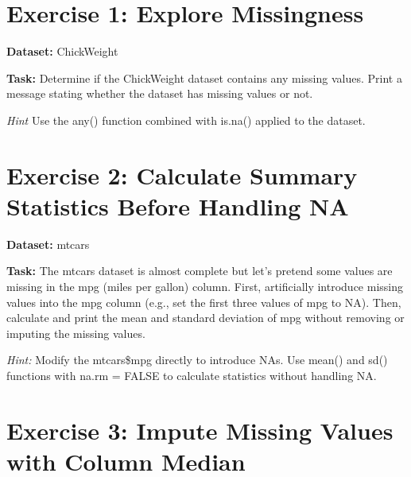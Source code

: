 \documentclass[
]{book}
\newenvironment{Shaded}{\begin{snugshade}}{\end{snugshade}}
\newcommand{\CommentTok}[1]{\textcolor[rgb]{0.56,0.35,0.01}{\textit{#1}}}
\newcommand{\FunctionTok}[1]{\textcolor[rgb]{0.13,0.29,0.53}{\textbf{#1}}}
\newcommand{\NormalTok}[1]{#1}
\newcommand{\OtherTok}[1]{\textcolor[rgb]{0.56,0.35,0.01}{#1}}
\newcommand{\SpecialCharTok}[1]{\textcolor[rgb]{0.81,0.36,0.00}{\textbf{#1}}}
\begin{document}
\section*{Exercise 1: Explore Missingness}\label{exercise-1-explore-missingness}

\textbf{Dataset:} ChickWeight

\textbf{Task:} Determine if the ChickWeight dataset contains any missing
values. Print a message stating whether the dataset has missing values
or not.

\emph{Hint} Use the any() function combined with is.na() applied to the
dataset.

\section*{Exercise 2: Calculate Summary Statistics Before Handling NA}\label{exercise-2-calculate-summary-statistics-before-handling-na}

\begin{Shaded}
\end{Shaded}

\textbf{Dataset:} mtcars

\textbf{Task:} The mtcars dataset is almost complete but let's pretend some
values are missing in the mpg (miles per gallon) column. First,
artificially introduce missing values into the mpg column (e.g., set the
first three values of mpg to NA). Then, calculate and print the mean and
standard deviation of mpg without removing or imputing the missing
values.

\emph{Hint:} Modify the mtcars\$mpg directly to introduce NAs. Use mean() and
sd() functions with na.rm = FALSE to calculate statistics without
handling NA.

\section*{Exercise 3: Impute Missing Values with Column Median}\label{exercise-3-impute-missing-values-with-column-median}
\end{document}
